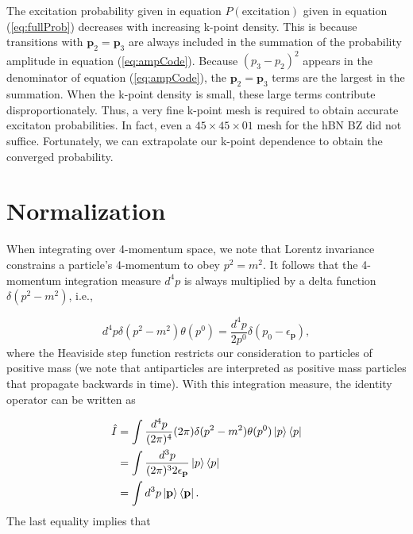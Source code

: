 \documentclass{article}
\begin{document}
The excitation probability given in equation $P(\text{excitation})$ given in equation (\ref{eq:fullProb}) decreases with increasing k-point density.  This is because transitions with $\mathbf{p}_2=\mathbf{p}_3$ are always included in the summation of the probability amplitude in equation (\ref{eq:ampCode}). Because $(p_3-p_2)^2$ appears in the denominator of equation (\ref{eq:ampCode}), the $\mathbf{p}_2=\mathbf{p}_3$ terms are the largest in the summation.  When the k-point density is small, these large terms contribute disproportionately.  Thus, a very fine k-point mesh is required to obtain accurate excitaton probabilities.  In fact, even a $45\times45\times01$ mesh for the hBN BZ did not suffice.  Fortunately, we can extrapolate our k-point dependence to obtain the converged probability.

\section{Normalization}
\label{app:normalization}

When integrating over 4-momentum space, we note that Lorentz invariance constrains a particle's 4-momentum to obey $p^2 = m^2$.  It follows that the 4-momentum integration measure $d^4p$ is always multiplied by a delta function $\delta(p^2-m^2)$, i.e.,

\begin{equation}
    d^4p\delta(p^2 - m^2)\theta(p^0)
    =
    \frac{d^4p}{2p^0}\delta(p_0 - \epsilon_\mathbf{p}),
\end{equation}
%
where the Heaviside step function restricts our consideration to particles of positive mass (we note that antiparticles are interpreted as positive mass particles that propagate backwards in time).  With this integration measure, the identity operator can be written as

\begin{equation}
\label{eq:identity}
\begin{aligned}
    \hat{I}
    &=
    \int \frac{d^4p}{(2\pi)^4}(2\pi)\delta(p^2 - m^2)\theta(p^0)
    \ket{p}\bra{p}
    \\&=
    \int \frac{d^3p}{(2\pi)^3 2\epsilon_\mathbf{p}}
    \ket{p}\bra{p}
    \\&=
    \int d^3p
    \ket{\mathbf{p}}\bra{\mathbf{p}}.
\end{aligned}
\end{equation}
%
The last equality implies that
\end{document}
